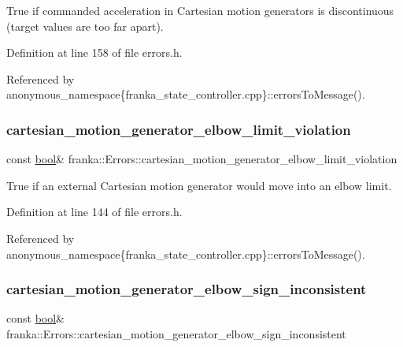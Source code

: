 True if commanded acceleration in Cartesian motion generators is discontinuous (target values are too far apart). 

Definition at line 158 of file errors.\+h.



Referenced by anonymous\+\_\+namespace\{franka\+\_\+state\+\_\+controller.\+cpp\}\+::errors\+To\+Message().

\mbox{\label{structfranka_1_1Errors_ac21ebdc1e0e8fb3099a7dce284550c4c}} 
\subsubsection{\texorpdfstring{cartesian\+\_\+motion\+\_\+generator\+\_\+elbow\+\_\+limit\+\_\+violation}{cartesian\_motion\_generator\_elbow\_limit\_violation}}
{\footnotesize\ttfamily const \hyperlink{classbool}{bool}\& franka\+::\+Errors\+::cartesian\+\_\+motion\+\_\+generator\+\_\+elbow\+\_\+limit\+\_\+violation}

True if an external Cartesian motion generator would move into an elbow limit. 

Definition at line 144 of file errors.\+h.



Referenced by anonymous\+\_\+namespace\{franka\+\_\+state\+\_\+controller.\+cpp\}\+::errors\+To\+Message().

\mbox{\label{structfranka_1_1Errors_a58b0e1199c9dded5a32bfeb110e63037}} 
\subsubsection{\texorpdfstring{cartesian\+\_\+motion\+\_\+generator\+\_\+elbow\+\_\+sign\+\_\+inconsistent}{cartesian\_motion\_generator\_elbow\_sign\_inconsistent}}
{\footnotesize\ttfamily const \hyperlink{classbool}{bool}\& franka\+::\+Errors\+::cartesian\+\_\+motion\+\_\+generator\+\_\+elbow\+\_\+sign\+\_\+inconsistent}

